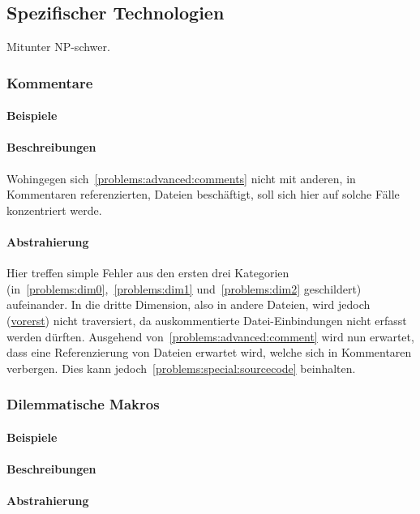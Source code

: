 \subsection{Spezifischer Technologien}\label{problems:special}
Mitunter NP-schwer.
\subsubsection{Kommentare}\label{problems:advanced:comments}
\paragraph*{Beispiele}
\paragraph*{Beschreibungen}
Wohingegen sich~\ref{problems:advanced:comments} nicht mit anderen, in Kommentaren referenzierten, Dateien beschäftigt, soll sich hier auf solche Fälle konzentriert werde.
\paragraph*{Abstrahierung}
Hier treffen simple Fehler aus den ersten drei Kategorien (in~\ref{problems:dim0},~\ref{problems:dim1} und~\ref{problems:dim2} geschildert) aufeinander. In die dritte Dimension, also in andere Dateien, wird jedoch (\hyperref[problems:special:comments]{vorerst}) nicht traversiert, da auskommentierte Datei-Einbindungen nicht erfasst werden dürften. 
Ausgehend von~\ref{problems:advanced:comment} wird nun erwartet, dass eine Referenzierung von Dateien erwartet wird, welche sich in Kommentaren verbergen. Dies kann jedoch~\ref{problems:special:sourcecode} beinhalten.


\subsubsection{Dilemmatische Makros}\label{problems:special:macrodilemma}
\paragraph*{Beispiele}
\paragraph*{Beschreibungen}
\paragraph*{Abstrahierung}


